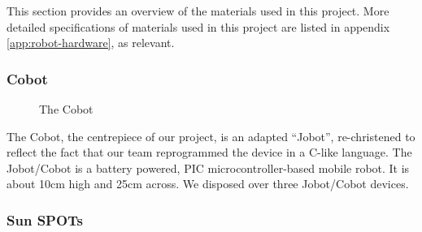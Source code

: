 \documentclass[a4paper,10pt]{article} %
\begin{document}
This section provides an overview of the materials used in this project. More
detailed specifications of materials used in this project are listed in appendix
\ref{app:robot-hardware}, as relevant.

\subsubsection{Cobot}

\begin{figure}[h]
    \centering
    \caption{The Cobot}
    \label{fig:cobotviews}
\end{figure}

The Cobot, the centrepiece of our project, is an adapted ``Jobot'',
re-christened to reflect the fact that our team reprogrammed the device in a
C-like language. The Jobot/Cobot is a battery powered, PIC microcontroller-based
mobile robot. It is about 10cm high and 25cm across. We disposed over three
Jobot/Cobot devices.

\subsubsection{Sun SPOTs}
\end{document}
